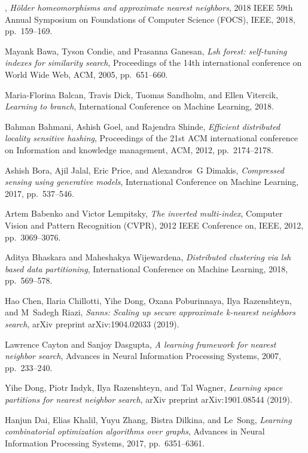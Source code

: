 \documentclass[11pt]{article}
\begin{document}
\begin{thebibliography}{10}
\begin{small}
\bysame, \emph{H{\"o}lder homeomorphisms and approximate nearest neighbors}, 2018 IEEE 59th Annual Symposium on Foundations of Computer Science (FOCS), IEEE, 2018, pp.~159--169.

Mayank Bawa, Tyson Condie, and Prasanna Ganesan, \emph{Lsh forest: self-tuning indexes for similarity search}, Proceedings of the 14th international conference on World Wide Web, ACM, 2005, pp.~651--660.

Maria-Florina Balcan, Travis Dick, Tuomas Sandholm, and Ellen Vitercik, \emph{Learning to branch}, International Conference on Machine Learning, 2018.

Bahman Bahmani, Ashish Goel, and Rajendra Shinde, \emph{Efficient distributed locality sensitive hashing}, Proceedings of the 21st ACM international conference on Information and knowledge management, ACM, 2012, pp.~2174--2178.

Ashish Bora, Ajil Jalal, Eric Price, and Alexandros~G Dimakis, \emph{Compressed sensing using generative models}, International Conference on Machine Learning, 2017, pp.~537--546.

Artem Babenko and Victor Lempitsky, \emph{The inverted multi-index}, Computer Vision and Pattern Recognition (CVPR), 2012 IEEE Conference on, IEEE, 2012, pp.~3069--3076.


Aditya Bhaskara and Maheshakya Wijewardena, \emph{Distributed clustering via lsh based data partitioning}, International Conference on Machine Learning, 2018, pp.~569--578.

Hao Chen, Ilaria Chillotti, Yihe Dong, Oxana Poburinnaya, Ilya Razenshteyn, and M~Sadegh Riazi, \emph{Sanns: Scaling up secure approximate k-nearest neighbors search}, arXiv preprint arXiv:1904.02033 (2019).

Lawrence Cayton and Sanjoy Dasgupta, \emph{A learning framework for nearest neighbor search}, Advances in Neural Information Processing Systems, 2007, pp.~233--240.

Yihe Dong, Piotr Indyk, Ilya Razenshteyn, and Tal Wagner, \emph{Learning space partitions for nearest neighbor search}, arXiv preprint arXiv:1901.08544 (2019).

Hanjun Dai, Elias Khalil, Yuyu Zhang, Bistra Dilkina, and Le~Song, \emph{Learning combinatorial optimization algorithms over graphs}, Advances in Neural Information Processing Systems, 2017, pp.~6351--6361.


\end{small}
\end{thebibliography}
\end{document}
